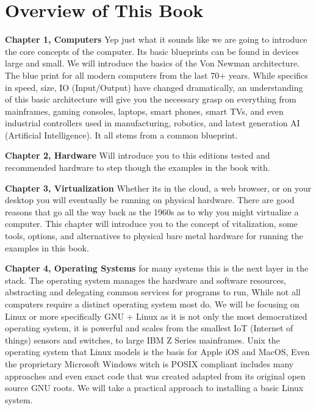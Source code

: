 \section*{Overview of This Book}

\begin{flushleft}
\textbf{Chapter 1, Computers} Yep just what it sounds like we are going to introduce the core concepts of the computer. Its basic blueprints can be found in devices large and small. We will introduce the basics of the Von Newman architecture. The blue print for all modern computers from the last 70+ years. While specifics in speed, size, IO (Input/Output) have changed dramatically, an understanding of this basic architecture will give you the necessary grasp on everything from mainframes, gaming consoles, laptops, smart phones, smart TVs, and even industrial controllers used in manufacturing, robotics, and latest generation AI (Artificial Intelligence). It all stems from a common blueprint.\newline

\textbf{Chapter 2, Hardware} Will introduce you to this editions tested and recommended hardware to step though the examples in the book with. \newline

\textbf{Chapter 3, Virtualization} Whether its in the cloud, a web browser, or on your desktop you will eventually be running on physical hardware. There are good reasons that go all the way back as the 1960s as to why you might virtualize a computer. This chapter will introduce you to the concept of vitalization, some tools, options, and alternatives to physical bare metal hardware for running the examples in this book. \newline

\textbf{Chapter 4, Operating Systems} for many systems this is the next layer in the stack. The operating system manages the hardware and software resources, abstracting and delegating common services for programs to run, While not all computers require a distinct operating system most do. We will be focusing on Linux or more specifically GNU + Linux as it is not only the most democratized operating system, it is powerful and scales from the smallest IoT (Internet of things) sensors and switches, to large IBM Z Series mainframes. Unix the operating system that Linux models is the basis for Apple iOS and MacOS, Even the proprietary Microsoft Windows witch is POSIX compliant includes many approaches and even exact code that was created adapted from its original open source GNU roots. We will take a practical approach to installing a basic Linux system. \newline


\end{flushleft}
